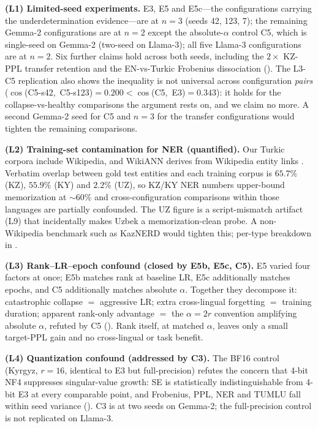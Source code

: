 \documentclass[11pt]{article}
\begin{document}
\textbf{(L1) Limited-seed experiments.} E3, E5 and E5c---the configurations carrying the underdetermination evidence---are at $n{=}3$ (seeds 42, 123, 7); the remaining Gemma-2 configurations are at $n{=}2$ except the absolute-$\alpha$ control C5, which is single-seed on Gemma-2 (two-seed on Llama-3); all five Llama-3 configurations are at $n{=}2$. Six further claims hold across both seeds, including the $2\times$ KZ-PPL transfer retention and the EN-vs-Turkic Frobenius dissociation (). The L3-C5 replication also shows the inequality is not universal across configuration \emph{pairs} ($\cos$(C5-s42,~C5-s123)$=0.200 < \cos$(C5,~E3)$=0.343$): it holds for the collapse-vs-healthy comparisons the argument rests on, and we claim no more. A second Gemma-2 seed for C5 and $n{=}3$ for the transfer configurations would tighten the remaining comparisons.

\textbf{(L2) Training-set contamination for NER (quantified).} Our Turkic corpora include Wikipedia, and WikiANN derives from Wikipedia entity links \cite{pan2017cross}. Verbatim overlap between gold test entities and each training corpus is $65.7\%$ (KZ), $55.9\%$ (KY) and $2.2\%$ (UZ), so KZ/KY NER numbers upper-bound memorization at ${\sim}60\%$ and cross-configuration comparisons within those languages are partially confounded. The UZ figure is a script-mismatch artifact (L9) that incidentally makes Uzbek a memorization-clean probe. A non-Wikipedia benchmark such as KazNERD \cite{yeshpanov2022kaznerd} would tighten this; per-type breakdown in .

\textbf{(L3) Rank--LR--epoch confound (closed by E5b, E5c, C5).} E5 varied four factors at once; E5b matches rank at baseline LR, E5c additionally matches epochs, and C5 additionally matches absolute $\alpha$. Together they decompose it: catastrophic collapse $=$ aggressive LR; extra cross-lingual forgetting $=$ training duration; apparent rank-only advantage $=$ the $\alpha{=}2r$ convention amplifying absolute $\alpha$, refuted by C5 (). Rank itself, at matched $\alpha$, leaves only a small target-PPL gain and no cross-lingual or task benefit.

\textbf{(L4) Quantization confound (addressed by C3).} The BF16 control (Kyrgyz, $r{=}16$, identical to E3 but full-precision) refutes the concern that 4-bit NF4 suppresses singular-value growth: SE is statistically indistinguishable from 4-bit E3 at every comparable point, and Frobenius, PPL, NER and TUMLU fall within seed variance (). C3 is at two seeds on Gemma-2; the full-precision control is not replicated on Llama-3.
\end{document}
